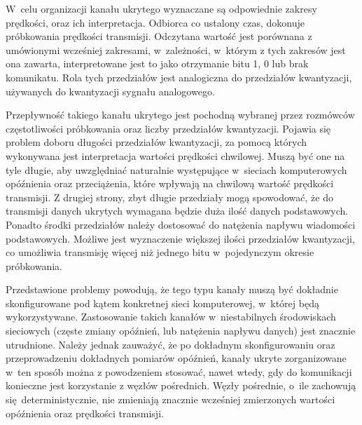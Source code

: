 \documentclass[a4paper, twoside, 12pt]{report}
\begin{document}
        W~celu organizacji kanału ukrytego wyznaczane są odpowiednie zakresy prędkości, oraz ich
        interpretacja. Odbiorca co ustalony czas, dokonuje próbkowania prędkości
        transmisji. Odczytana wartość jest porównana z umówionymi wcześniej zakresami,
        w~zależności, w~którym z tych zakresów jest ona zawarta, interpretowane jest to
        jako otrzymanie bitu 1, 0 lub brak komunikatu. Rola tych przedziałów jest analogiczna
        do przedziałów kwantyzacji, używanych do kwantyzacji sygnału analogowego.

        Przepływność takiego kanału ukrytego jest pochodną wybranej przez rozmówców
        częstotliwości próbkowania oraz liczby przedziałów kwantyzacji. Pojawia się
        problem doboru długości przedziałów kwantyzacji, za pomocą których wykonywana
        jest interpretacja wartości
        prędkości chwilowej. Muszą być one na tyle długie, aby uwzględniać naturalnie
        występujące w~sieciach komputerowych opóźnienia oraz przeciążenia, które wpływają
        na chwilową wartość prędkości transmisji. Z drugiej strony, zbyt długie przedziały
        mogą spowodować, że do transmisji danych ukrytych wymagana będzie duża ilość danych
        podstawowych. Ponadto środki przedziałów należy dostosować do natężenia
        napływu wiadomości podstawowych. Możliwe jest wyznaczenie większej ilości
        przedziałów kwantyzacji, co umożliwia transmisję więcej niż jednego bitu w~pojedynczym
        okresie próbkowania.

        Przedstawione problemy powodują, że tego typu kanały muszą być dokładnie
        skonfigurowane pod kątem konkretnej sieci komputerowej, w~której będą wykorzystywane.
        Zastosowanie takich kanałów w~niestabilnych środowiskach sieciowych (częste zmiany
        opóźnień, lub natężenia napływu danych) jest znacznie utrudnione. Należy jednak
        zauważyć, że po dokładnym skonfigurowaniu oraz przeprowadzeniu dokładnych
        pomiarów opóźnień, kanały ukryte zorganizowane w~ten sposób można z powodzeniem
        stosować, nawet wtedy, gdy do komunikacji konieczne jest korzystanie z węzłów pośrednich.
        Węzły pośrednie, o~ile zachowują się deterministycznie, nie zmieniają znacznie wcześniej
        zmierzonych wartości opóźnienia oraz prędkości transmisji.
\end{document}

